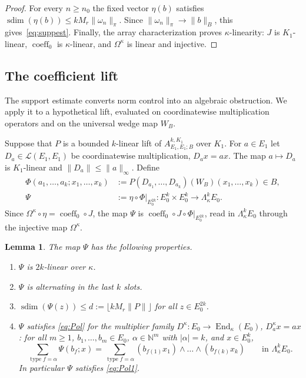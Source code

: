 \documentclass[11pt]{amsart}
\newtheorem{lemma}[theorem]{Lemma}
\theoremstyle{definition}
\theoremstyle{remark}
\numberwithin{equation}{section}
\newcommand{\N}{\mathbb N}
\newcommand{\cL}{\mathcal L}
\newcommand{\End}{\operatorname{End}}
\newcommand{\abs}[1]{\lvert #1\rvert}
\newcommand{\norm}[1]{\lVert #1\rVert}
\newcommand{\coeff}{\operatorname{coeff}}
\newcommand{\type}{\operatorname{type}}
\newcommand{\sdim}{\operatorname{sdim}}
\begin{document}
\begin{proof}
For every $n\ge n_0$ the fixed vector $\eta(b)$ satisfies
$\sdim(\eta(b))\le kM_r\norm{\omega_n}_\pi$. Since $\norm{\omega_n}_\pi\to\norm b_B$, this gives~\eqref{eq:suppest}.
Finally, the array characterization proves $\kappa$\nobreakdash-linearity: $J$ is $K_1$\nobreakdash-linear, $\coeff_0$ is
$\kappa$\nobreakdash-linear, and $\Omega^\kappa$ is linear and injective.
\end{proof}

\subsection{The coefficient lift}\label{ssec:Psi}
The support estimate converts norm control into an algebraic obstruction. We apply it to a hypothetical lift,
evaluated on coordinatewise multiplication operators and on the universal wedge map $W_B$.

Suppose that $P$ is a bounded $k$\nobreakdash-linear lift of $A^{k,K_1}_{E_1,E_1;B}$ over $K_1$. For $a\in E_1$ let
$D_a\in\cL(E_1,E_1)$ be coordinatewise multiplication, $D_ax=ax$. The map $a\mapsto D_a$ is $K_1$\nobreakdash-linear and
$\norm{D_a}\le\norm a_\infty$. Define
\begin{align*}
\Phi(a_1,\dots,a_k;x_1,\dots,x_k)&:=P(D_{a_1},\dots,D_{a_k})(W_B)(x_1,\dots,x_k)\in B,\\
\Psi&:=\eta\circ\Phi|_{E_0^{2k}}\colon E_0^k\times E_0^k\to\Lambda^k_\kappa E_0 .
\end{align*}
Since $\Omega^\kappa\circ\eta=\coeff_0\circ J$, the map $\Psi$ is $\coeff_0\circ J\circ\Phi|_{E_0^{2k}}$, read in $\Lambda^k_\kappa E_0$
through the injective map $\Omega^\kappa$.

\begin{lemma}\label{lem:Psi}
The map $\Psi$ has the following properties.
\begin{enumerate}
\item[($\Psi$1)] $\Psi$ is $2k$\nobreakdash-linear over $\kappa$.
\item[($\Psi$2)] $\Psi$ is alternating in the last $k$ slots.
\item[($\Psi$3)] $\sdim(\Psi(z))\le d:=\lfloor kM_r\norm P\rfloor$ for \emph{all} $z\in E_0^{2k}$.
\item[($\Psi$4)] $\Psi$ satisfies \eqref{eq:Pol} for the multiplier family $D^\kappa\colon E_0\to\End_\kappa(E_0)$,
$D^\kappa_ax=ax$: for all $m\ge1$, $b_1,\dots,b_m\in E_0$, $\alpha\in\N^m$ with $\abs\alpha=k$, and $x\in E_0^k$,
\[
\sum_{\type f=\alpha}\Psi(b_f;x)=\sum_{\type f=\alpha}(b_{f(1)}x_1)\wedge\dots\wedge(b_{f(k)}x_k)\qquad\text{in }\Lambda^k_\kappa E_0 .
\]
In particular $\Psi$ satisfies \eqref{eq:Pol1}.
\end{enumerate}
\end{lemma}
\end{document}
